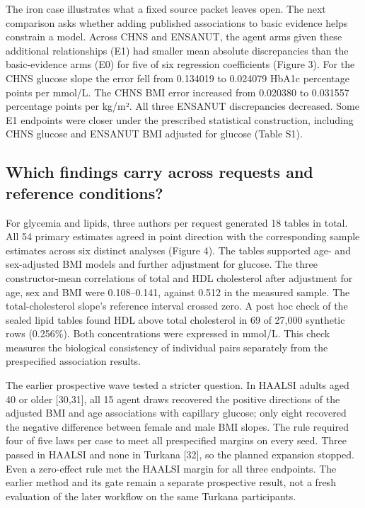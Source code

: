\documentclass[sigconf,review]{acmart}
\begin{document}
The iron case illustrates what a fixed source packet leaves open. The next comparison asks whether adding published associations to basic evidence helps constrain a model. Across CHNS and ENSANUT, the agent arms given these additional relationships (E1) had smaller mean absolute discrepancies than the basic-evidence arms (E0) for five of six regression coefficients (Figure 3). For the CHNS glucose slope the error fell from 0.134019 to 0.024079 HbA1c percentage points per mmol/\allowbreak{}L. The CHNS BMI error increased from 0.020380 to 0.031557 percentage points per kg/\allowbreak{}m². All three ENSANUT discrepancies decreased. Some E1 endpoints were closer under the prescribed statistical construction, including CHNS glucose and ENSANUT BMI adjusted for glucose (Table S1).


\subsection{Which findings carry across requests and reference conditions?}

For glycemia and lipids, three authors per request generated 18 tables in total. All 54 primary estimates agreed in point direction with the corresponding sample estimates across six distinct analyses (Figure 4). The tables supported age- and sex-adjusted BMI models and further adjustment for glucose. The three constructor-mean correlations of total and HDL cholesterol after adjustment for age, sex and BMI were 0.108–\allowbreak{}0.141, against 0.512 in the measured sample. The total-cholesterol slope's reference interval crossed zero. A post hoc check of the sealed lipid tables found HDL above total cholesterol in 69 of 27,000 synthetic rows (0.256\%). Both concentrations were expressed in mmol/\allowbreak{}L. This check measures the biological consistency of individual pairs separately from the prespecified association results.


The earlier prospective wave tested a stricter question. In HAALSI adults aged 40 or older [30,31], all 15 agent draws recovered the positive directions of the adjusted BMI and age associations with capillary glucose; only eight recovered the negative difference between female and male BMI slopes. The rule required four of five laws per case to meet all prespecified margins on every seed. Three passed in HAALSI and none in Turkana [32], so the planned expansion stopped. Even a zero-effect rule met the HAALSI margin for all three endpoints. The earlier method and its gate remain a separate prospective result, not a fresh evaluation of the later workflow on the same Turkana participants.
\end{document}
